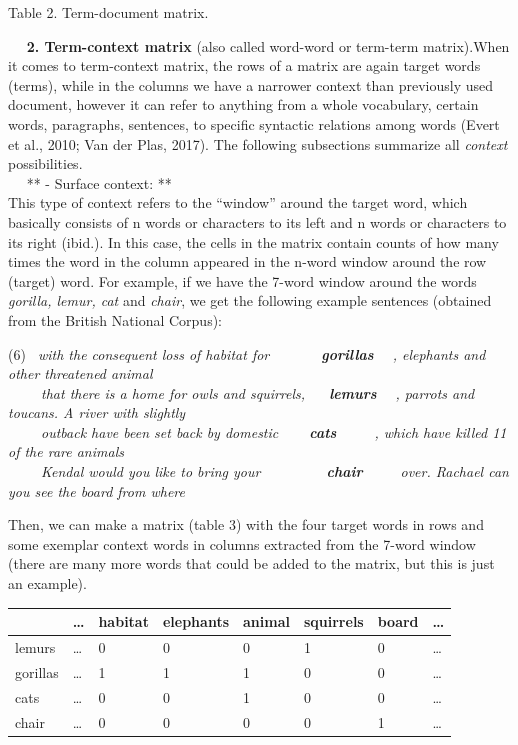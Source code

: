 \documentclass[11pt]{article}
\begin{document}
Table 2. Term-document matrix.

    \textbf{2. Term-context matrix} (also called word-word or term-term
matrix).When it comes to term-context matrix, the rows of a matrix are
again target words (terms), while in the columns we have a narrower
context than previously used document, however it can refer to anything
from a whole vocabulary, certain words, paragraphs, sentences, to
specific syntactic relations among words (Evert et al., 2010; Van der
Plas, 2017). The following subsections summarize all \emph{context}
possibilities.\\
    ** - Surface context: **\\
This type of context refers to the ``window'' around the target word,
which basically consists of n words or characters to its left and n
words or characters to its right (ibid.). In this case, the cells in the
matrix contain counts of how many times the word in the column appeared
in the n-word window around the row (target) word. For example, if we
have the 7-word window around the words \emph{gorilla, lemur, cat} and
\emph{chair}, we get the following example sentences (obtained from the
British National Corpus):

(6)\emph{  with the consequent loss of habitat for       
\textbf{gorillas}   , elephants and other threatened animal\\
     that there is a home for owls and squirrels,    \textbf{lemurs}   ,
parrots and toucans. A river with slightly\\
     outback have been set back by domestic     \textbf{cats}      ,
which have killed 11 of the rare animals\\
     Kendal would you like to bring your          \textbf{chair}     
over. Rachael can you see the board from where}

Then, we can make a matrix (table 3) with the four target words in rows
and some exemplar context words in columns extracted from the 7-word
window (there are many more words that could be added to the matrix, but
this is just an example).

\begin{longtable}[]{@{}llllllll@{}}
\toprule
& \ldots{} & habitat & elephants & animal & squirrels & board &
\ldots{}\tabularnewline
\midrule
\endhead
lemurs & \ldots{} & 0 & 0 & 0 & 1 & 0 & \ldots{}\tabularnewline
gorillas & \ldots{} & 1 & 1 & 1 & 0 & 0 & \ldots{}\tabularnewline
cats & \ldots{} & 0 & 0 & 1 & 0 & 0 & \ldots{}\tabularnewline
chair & \ldots{} & 0 & 0 & 0 & 0 & 1 & \ldots{}\tabularnewline
\bottomrule
\end{longtable}
\end{document}
